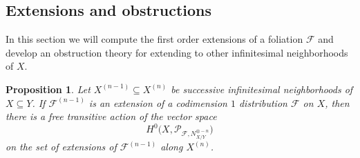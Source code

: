 \documentclass[reqno]{amsart}
\theoremstyle{plain}
\newcommand{\F}{\mathscr{F}}
\newcommand{\PP}{\mathcal{P}}
\newtheorem{proposition}[theorem]{Proposition}
\theoremstyle{definition}
\theoremstyle{named}
\begin{document}
\subsection{Extensions and obstructions}
In this section we will compute the first order extensions of a foliation $\F$ and develop an obstruction theory for extending to other infinitesimal neighborhoods of $X$. 

\begin{proposition} \label{extensions:dist}
Let $X^{(n-1)}\subseteq X^{(n)}$ be successive infinitesimal neighborhoods of $X\subseteq Y$. If $\F^{(n-1)}$ is an extension of a codimension $1$ distribution $\F$ on $X$, then there is a free transitive action of the vector space 
\[
H^0\big(X,\PP_{\F,N_{X/Y}^{\otimes - n}}\big)
\]
on the set of extensions of $\F^{(n-1)}$ along $X^{(n)}$. 
\end{proposition}
\end{document}
